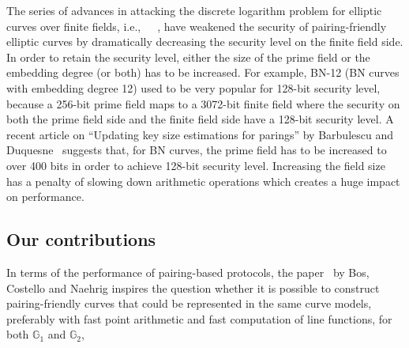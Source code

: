 The series of advances in attacking the discrete logarithm problem for elliptic curves over finite fields,
i.e.,~\cite{2016/KB}~\cite{2015/BGGM}~\cite{2015/BGK},
have weakened the security of pairing-friendly elliptic curves by dramatically decreasing the security level on the finite field side.
In order to retain the security level, either the size of the prime field or the embedding degree (or both) has to be increased.
For example, BN-12 (BN curves with embedding degree 12) used to be very popular for 128-bit security level,
because a 256-bit prime field maps to a 3072-bit finite field
where the security on both the prime field side and the finite field side have a 128-bit security level.
A recent article on ``Updating key size estimations for parings'' by Barbulescu and Duquesne~\cite{2017/keysize}
suggests that, for BN curves, the prime field has to be increased to over 400 bits in order to achieve 128-bit security level.
Increasing the field size has a penalty of slowing down arithmetic operations which creates a huge impact on performance.


\subsection{Our contributions}


In terms of the performance of pairing-based protocols,
the paper~\cite{2013/bos-pairing} by Bos, Costello and Naehrig
inspires the question whether it is possible to
construct pairing-friendly curves that could be represented in the same curve models,
preferably with fast point arithmetic and fast computation of line functions,
for both $\mathbb{G}_1$ and $\mathbb{G}_2$,

